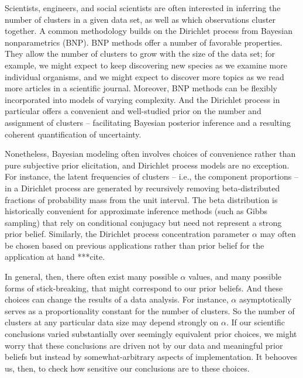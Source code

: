 Scientists, engineers, and social scientists are often interested
in inferring the number of clusters in a given data set, as well as which observations cluster together.
A common methodology builds on the Dirichlet process \citep{ferguson:1973:bayesian, sethuraman:1994:constructivedp}
from Bayesian nonparametrics (BNP).
BNP methods offer a number of favorable properties. They allow the number of clusters to grow with the size of the data set; for example, we might expect to keep discovering new species as we examine more individual organisms, and we might expect to discover more topics as we read more articles in a scientific journal. Moreover, BNP methods can be flexibly incorporated into models of varying complexity. And the Dirichlet process in particular offers a convenient and well-studied prior on the number and assignment of clusters -- facilitating Bayesian posterior inference and a resulting coherent quantification of uncertainty.

Nonetheless, Bayesian modeling often involves choices of convenience rather than pure subjective prior elicitation, and Dirichlet process models are no exception. For instance, the latent frequencies of clusters -- i.e., the component proportions -- in a Dirichlet process are generated by recursively removing beta-distributed fractions of probability mass from the unit interval. The beta distribution is historically convenient for approximate inference methods (such as Gibbs sampling) that rely on conditional conjugacy but need not represent a strong prior belief. Similarly, the Dirichlet process concentration parameter $\alpha$ may often be chosen based on previous applications rather than prior belief for the application at hand {\color{red}***cite.}

In general, then, there often exist many possible $\alpha$ values, and many possible forms of stick-breaking, that might correspond to our prior beliefs. And these choices can change the results of a data analysis. For instance, $\alpha$ asymptotically serves as a proportionality constant for the number of clusters. So the number of clusters at any particular data size may depend strongly on $\alpha$. If our scientific conclusions varied substantially over seemingly equivalent prior choices, we might worry that these conclusions are driven not by our data and meaningful prior beliefs but instead by somewhat-arbitrary aspects of implementation. It behooves us, then, to check how sensitive our conclusions are to these choices.

